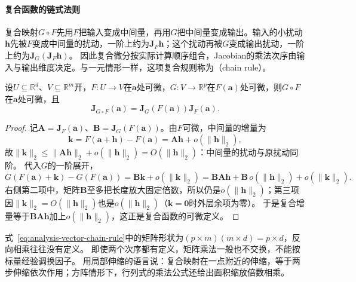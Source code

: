 \paragraph{复合函数的链式法则}
复合映射$G\circ F$先用$F$把输入变成中间量，再用$G$把中间量变成输出。输入的小扰动$\bm h$先被$F$变成中间量的扰动，一阶上约为$\bm J_F\bm h$；这个扰动再被$G$变成输出扰动，一阶上约为$\bm J_G(\bm J_F\bm h)$。
因此复合微分按实际计算顺序组合，Jacobian的乘法次序由输入与输出维度决定。与一元情形一样，这项复合规则称为（chain rule）。
\begin{theorem}[向量值函数的链式法则]
\label{thm:multivariable-vector-chain-rule}
设$U\subseteq\mathbb R^d$、$V\subseteq\mathbb R^m$开，$F:U\to V$在$\bm a$处可微，$G:V\to\mathbb R^p$在$F(\bm a)$处可微，则$G\circ F$在$\bm a$处可微，且
\begin{equation}
 \bm J_{G\circ F}(\bm a)=\bm J_G(F(\bm a))\bm J_F(\bm a).
\label{eq:analysis-vector-chain-rule}
\end{equation}
\end{theorem}
\begin{proof}
记$\bm A=\bm J_F(\bm a)$、$\bm B=\bm J_G(F(\bm a))$。由$F$可微，中间量的增量为
\[
 \bm k=F(\bm a+\bm h)-F(\bm a)=\bm A\bm h+o(\lVert\bm h\rVert_2),
\]
故$\lVert\bm k\rVert_2\leq\lVert\bm A\bm h\rVert_2+o(\lVert\bm h\rVert_2)=O(\lVert\bm h\rVert_2)$：中间量的扰动与原扰动同阶。
代入$G$的一阶展开，
\[
 G(F(\bm a)+\bm k)-G(F(\bm a))=\bm B\bm k+o(\lVert\bm k\rVert_2)
 =\bm B\bm A\bm h+\bm B\,o(\lVert\bm h\rVert_2)+o(\lVert\bm k\rVert_2).
\]
右侧第二项中，矩阵$\bm B$至多把长度放大固定倍数，所以仍是$o(\lVert\bm h\rVert_2)$；第三项因$\lVert\bm k\rVert_2=O(\lVert\bm h\rVert_2)$也是$o(\lVert\bm h\rVert_2)$（$\bm k=\bm0$时外层余项为零）。
于是复合增量等于$\bm B\bm A\bm h$加上$o(\lVert\bm h\rVert_2)$，这正是复合函数的可微定义。
\end{proof}
式~\eqref{eq:analysis-vector-chain-rule}中的矩阵形状为$(p\times m)(m\times d)=p\times d$，反向相乘往往没有定义。
即使两个次序都有定义，矩阵乘法一般也不交换，不能按标量经验调换因子。
用局部伸缩的语言说：复合映射在一点附近的伸缩，等于两步伸缩依次作用；方阵情形下，行列式的乘法公式还给出面积缩放倍数相乘。

